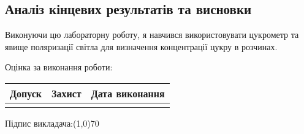 \documentclass[12pt]{article}
\begin{document}
\subsection*{Аналіз кінцевих результатів та висновки}
Виконуючи цю лабораторну роботу, я навчився використовувати
цукрометр та явище поляризації світла для визначення
концентрації цукру в розчинах.

\vspace{350pt}
{\fontsize{14}{16.2}\selectfont
Оцінка за виконання роботи:
\smallskip

\renewcommand{\arraystretch}{4}
\begin{tabular}{|c|c|c|}
	\hline
	\hspace{15pt} Допуск \hspace{15pt} & \hspace{15pt} Захист \hspace{15pt}
	& \hspace{15pt} Дата виконання \hspace{15pt}\\
	\hline
	 &  & \\
	\hline

\end{tabular}

\bigskip

	\begin{flushright}
		Підпис викладача:\line(1,0){70}\hspace{100pt}\hphantom{1pt}
	\end{flushright}
	}
\end{document}
